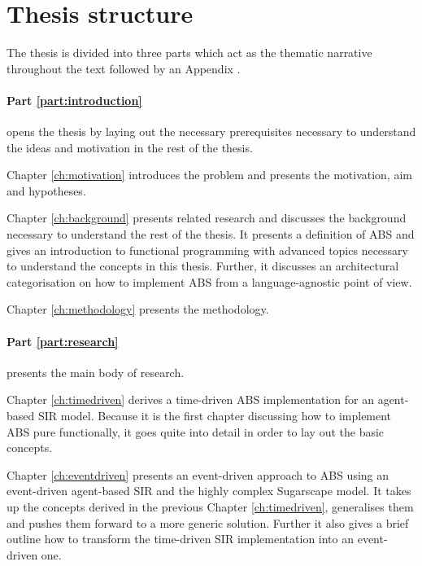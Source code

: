 \section{Thesis structure}

The thesis is divided into three parts which act as the thematic narrative throughout the text followed by an Appendix . 

\paragraph{Part \ref{part:introduction}} opens the thesis by laying out the necessary prerequisites necessary to understand the ideas and motivation in the rest of the thesis.
\medskip

Chapter \ref{ch:motivation} introduces the problem and presents the motivation, aim and hypotheses.

\medskip

Chapter \ref{ch:background} presents related research and discusses the background necessary to understand the rest of the thesis. It presents a definition of ABS and gives an introduction to functional programming with advanced topics necessary to understand the concepts in this thesis. Further, it discusses an architectural categorisation on how to implement ABS from a language-agnostic point of view.

\medskip

Chapter \ref{ch:methodology} presents the methodology.

\medskip

\paragraph{Part \ref{part:research}} presents the main body of research.

\medskip

Chapter \ref{ch:timedriven} derives a time-driven ABS implementation for an agent-based SIR model. Because it is the first chapter discussing how to implement ABS pure functionally, it goes quite into detail in order to lay out the basic concepts.

\medskip

Chapter \ref{ch:eventdriven} presents an event-driven approach to ABS using an event-driven agent-based SIR and the highly complex Sugarscape model. It takes up the concepts derived in the previous Chapter \ref{ch:timedriven}, generalises them and pushes them forward to a more generic solution. Further it also gives a brief outline how to transform the time-driven SIR implementation into an event-driven one.

